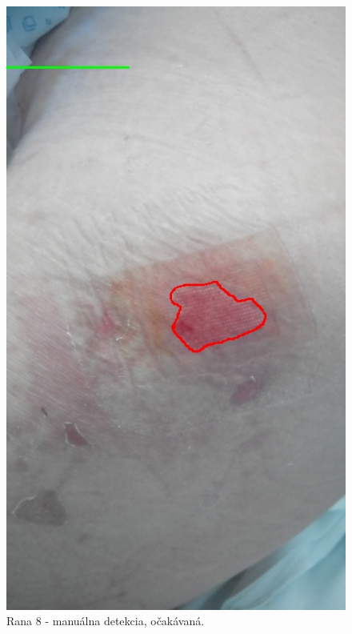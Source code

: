 \begin{figure}[h]
\begin{minipage}{0.48\textwidth}
     \includegraphics[scale=0.35]{fig/8m.jpeg}
      \caption{Rana 8 - manuálna detekcia, očakávaná.}
      \label{fig:w8}
   \end{minipage}\hfill
   \begin{minipage}{0.48\textwidth}
     \centering

\end{minipage}
\end{figure}

